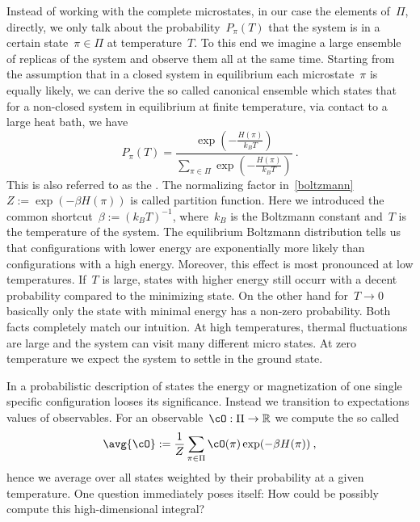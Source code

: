 Instead of working with the complete microstates, in our case the elements
of~$\Pi$, directly, we only talk about the probability~$P_{\pi}(T)$ that the
system is in a certain state~$\pi \in \Pi$ at temperature~$T$. To this end we
imagine a large ensemble of replicas of the system and observe them all at the
same time. Starting from the assumption that in a closed system in equilibrium
each microstate~$\pi$ is equally likely, we can derive the so called canonical
ensemble which states that for a non-closed system in equilibrium at finite
temperature, \eg{} via contact to a large heat bath, we have
%
\begin{equation}\label{boltzmann}
  P_{\pi}(T) = \frac{\exp \left(- \frac{H(\pi)}{k_B T}\right)}
  {\sum_{\pi \in \Pi} \exp \left(- \frac{H(\pi)}{k_B T}\right)}\:.
\end{equation}
%
This is also referred to as the .
The normalizing factor in~\eqref{boltzmann}~$Z := \exp(-\beta H(\pi))$ is called
partition function. Here we introduced the common shortcut~$\beta := {(k_B
T)}^{-1}$, where~$k_B$ is the Boltzmann constant and~$T$ is the temperature of
the system. The equilibrium Boltzmann distribution tells us that configurations
with lower energy are exponentially more likely than configurations with a high
energy. Moreover, this effect is most pronounced at low temperatures. If~$T$ is
large, states with higher energy still occurr with a decent probability compared
to the minimizing state. On the other hand for~$T \to 0$ basically only the
state with minimal energy has a non-zero probability. Both facts completely
match our intuition. At high temperatures, thermal fluctuations are large and
the system can visit many different micro states. At zero temperature we expect
the system to settle in the ground state.

In a probabilistic description of states the energy or magnetization of one
single specific configuration looses its significance. Instead we transition to
expectations values of observables. For an observable~$\map{\cO}{\Pi}{\bR}$ we
compute the so called 
%
\begin{equation}
  \avg{\cO} := \frac{1}{Z} \sum_{\pi \in \Pi} \cO(\pi) \exp(- \beta H(\pi))\:,
\end{equation}
%
hence we average over all states weighted by their probability at a given
temperature. One question immediately poses itself: How could be possibly
compute this high-dimensional integral?

